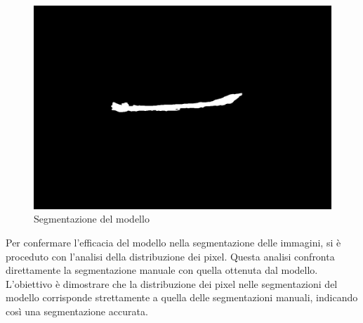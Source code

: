 \begin{figure}[!ht]
    \centering
    \includegraphics[width=0.6\columnwidth]{Immagini/prediction.png}
    \caption{Segmentazione del modello}
    \label{fig:segmentazione_del_modello}
\end{figure}


Per confermare l'efficacia del modello nella segmentazione delle immagini, si è proceduto con
l'analisi della distribuzione dei pixel. Questa analisi confronta direttamente la segmentazione
manuale con quella ottenuta dal modello. L'obiettivo è dimostrare che la distribuzione dei pixel
nelle segmentazioni del modello corrisponde strettamente a quella delle segmentazioni manuali,
indicando così una segmentazione accurata.



